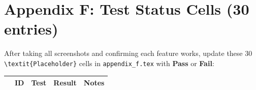 \documentclass[11pt,a4paper]{article}
\begin{document}
\section{Appendix F: Test Status Cells (30 entries)}

After taking all screenshots and confirming each feature works, update these 30 \texttt{\textbackslash textit\{Placeholder\}} cells in \texttt{appendix\_f.tex} with \textbf{Pass} or \textbf{Fail}:

\begin{center}
\begin{longtable}{@{}p{0.4cm} p{1.2cm} p{4.5cm} p{1.5cm} p{4.5cm}@{}}
  \toprule
  & \textbf{ID} & \textbf{Test} & \textbf{Result} & \textbf{Notes} \\
  \midrule


\end{longtable}
\end{center}
\end{document}
